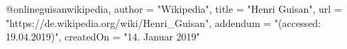 @online{guisanwikipedia,
    author = "Wikipedia",
    title = "Henri Guisan",
    url  = "https://de.wikipedia.org/wiki/Henri_Guisan",
    addendum = "(accessed: 19.04.2019)",
    createdOn = "14. Januar 2019"
}